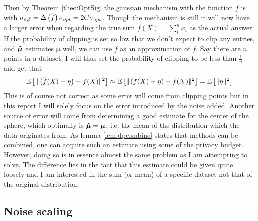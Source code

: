 \documentclass[a4paper,12pt]{article}
\begin{document}
Then by Theorem \ref{theo:OptSig} the 
gaussian mechanism with the function $\overline{f}$ is \edp with
$\sigma_{\varepsilon, \delta} = \Delta\left (\overline{f}\right) \sigma_{opt} = 2C \sigma_{opt}$.
Though the mechanism is still \edp it will now have 
a larger error when regarding the true sum
$f(X) = \sum_i^n x_i$ as the actual answer. If the probability of clipping is set
so low that we don't expect to clip any entries, and $\bm{\hat{\mu}}$ estimates $\bm{\mu}$ well, we can use $\overline{f}$ as an approximation of $f$.
Say there are $n$ points in a dataset, I will thus set the probability of clipping to be less than $\frac{1}{n}$ and get that
\[
    \mathbb{E} \left [ \| \left (\overline{f}(X) + \eta\right) - f(X) \|^2 \right] \approx \mathbb{E} \left [ \| \left (f(X) + \eta\right) - f(X) \|^2 \right] = \mathbb{E} \left [ \| \eta \|^2 \right]
\]
This is of course not correct as some error will come from clipping points but in this report 
I will solely focus on the error introduced by the noise added. Another source of error will come from
determining a good estimate for the center of the sphere, which optimally is $\bm{\hat{\mu}} = \bm{\mu}$, i.e. 
the mean of the distribution which the data originates from.
As lemma \ref{lem:dpcombine} states that \edp methods can be combined,
one can acquire such an estimate using some of the privacy budget.
However, doing so is in essence almost the same problem as I am attempting to solve.
The difference lies in the fact that this estimate could be given quite 
loosely and I am interested in the sum (or mean) of a specific dataset not that of the original distribution. \\

\subsection{Noise scaling}
\end{document}
